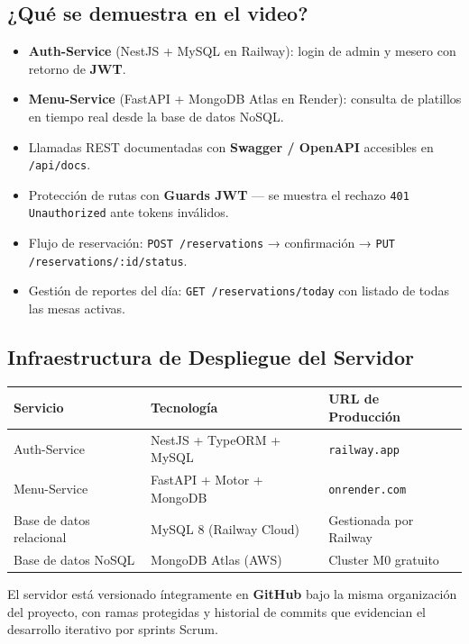 \documentclass[12pt,a4paper]{article}
\begin{document}
\subsection{¿Qué se demuestra en el video?}

\begin{itemize}
  \item \textbf{Auth-Service} (NestJS + MySQL en Railway): login de admin y mesero con retorno de \textbf{JWT}.
  \item \textbf{Menu-Service} (FastAPI + MongoDB Atlas en Render): consulta de platillos en tiempo real desde la base de datos NoSQL.
  \item Llamadas REST documentadas con \textbf{Swagger / OpenAPI} accesibles en \texttt{/api/docs}.
  \item Protección de rutas con \textbf{Guards JWT} --- se muestra el rechazo \texttt{401 Unauthorized} ante tokens inválidos.
  \item Flujo de reservación: \texttt{POST /reservations} → confirmación → \texttt{PUT /reservations/:id/status}.
  \item Gestión de reportes del día: \texttt{GET /reservations/today} con listado de todas las mesas activas.
\end{itemize}

\subsection{Infraestructura de Despliegue del Servidor}

\begin{center}\small
\begin{tabular}{|l|l|l|}
\hline
\textbf{Servicio} & \textbf{Tecnología} & \textbf{URL de Producción} \\
\hline
Auth-Service & NestJS + TypeORM + MySQL & \texttt{railway.app} \\
Menu-Service & FastAPI + Motor + MongoDB & \texttt{onrender.com} \\
Base de datos relacional & MySQL 8 (Railway Cloud) & Gestionada por Railway \\
Base de datos NoSQL & MongoDB Atlas (AWS) & Cluster M0 gratuito \\
\hline
\end{tabular}
\end{center}

\vspace{0.3cm}
El servidor está versionado íntegramente en \textbf{GitHub} bajo la misma organización del proyecto, con ramas protegidas y historial de commits que evidencian el desarrollo iterativo por sprints Scrum.
\end{document}
